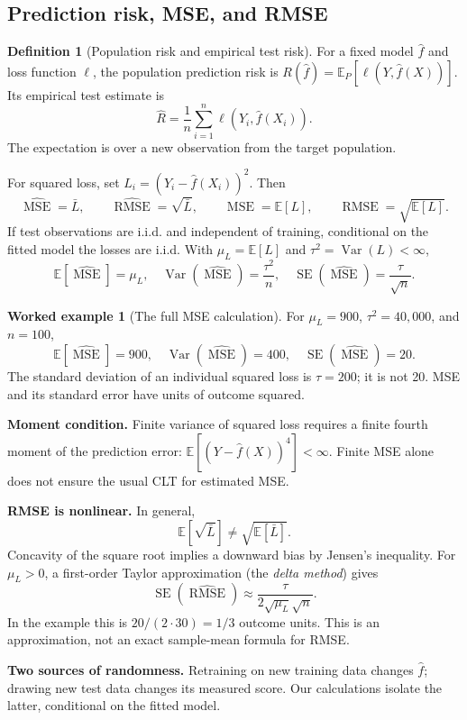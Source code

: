 \documentclass[11pt,letterpaper]{article}
\newcommand{\E}{\mathbb E}
\newcommand{\Var}{\operatorname{Var}}
\newcommand{\SE}{\operatorname{SE}}
\newcommand{\MSE}{\operatorname{MSE}}
\newcommand{\RMSE}{\operatorname{RMSE}}
\theoremstyle{definition}
\newtheorem{definition}[theorem]{Definition}
\newtheorem{example}[theorem]{Worked example}
\theoremstyle{remark}
\numberwithin{equation}{section}
\begin{document}
\subsection{Prediction risk, MSE, and RMSE}
\begin{definition}[Population risk and empirical test risk]
For a fixed model $\hat f$ and loss function $\ell$, the population prediction
risk is $R(\hat f)=\E_P[\ell(Y,\hat f(X))]$. Its empirical test estimate is
\[
\widehat R=\frac1n\sum_{i=1}^n\ell(Y_i,\hat f(X_i)).
\]
The expectation is over a new observation from the target population.
\end{definition}
For squared loss, set $L_i=(Y_i-\hat f(X_i))^2$. Then
\[
\widehat{\MSE}=\bar L,\qquad
\widehat{\RMSE}=\sqrt{\bar L},\qquad
\MSE=\E[L],\qquad \RMSE=\sqrt{\E[L]}.
\]
If test observations are i.i.d. and independent of training, conditional on the
fitted model the losses are i.i.d. With $\mu_L=\E[L]$ and
$\tau^2=\Var(L)<\infty$,
\begin{equation}
\E[\widehat{\MSE}]=\mu_L,\quad
\Var(\widehat{\MSE})=\frac{\tau^2}{n},\quad
\SE(\widehat{\MSE})=\frac{\tau}{\sqrt n}.
\end{equation}
\begin{example}[The full MSE calculation]
For $\mu_L=900$, $\tau^2=40{,}000$, and $n=100$,
\[
\E[\widehat{\MSE}]=900,\quad
\Var(\widehat{\MSE})=400,\quad
\SE(\widehat{\MSE})=20.
\]
The standard deviation of an individual squared loss is $\tau=200$; it is not
20. MSE and its standard error have units of outcome squared.
\end{example}
\textbf{Moment condition.} Finite variance of squared loss requires a finite
fourth moment of the prediction error: $\E[(Y-\hat f(X))^4]<\infty$.
Finite MSE alone does not ensure the usual CLT for estimated MSE.

\textbf{RMSE is nonlinear.} In general,
\[
\E[\sqrt{\bar L}]\neq\sqrt{\E[\bar L]}.
\]
Concavity of the square root implies a downward bias by Jensen's inequality.
For $\mu_L>0$, a first-order Taylor approximation (the \emph{delta method}) gives
\[
\SE(\widehat{\RMSE})\approx
\frac{\tau}{2\sqrt{\mu_L}\sqrt n}.
\]
In the example this is $20/(2\cdot30)=1/3$ outcome units. This is an approximation,
not an exact sample-mean formula for RMSE.

\textbf{Two sources of randomness.} Retraining on new training data changes
$\hat f$; drawing new test data changes its measured score. Our calculations
isolate the latter, conditional on the fitted model.
\newpage
\end{document}
